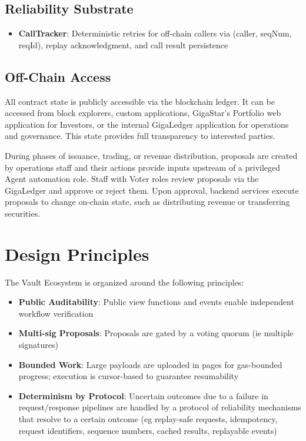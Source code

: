 \documentclass[10pt]{article}
\begin{document}
\subsection{Reliability Substrate}
\begin{itemize}
    \item \textbf{CallTracker}: Deterministic retries for off-chain callers via (caller, seqNum, reqId), replay acknowledgment, and call result persistence
\end{itemize}

\subsection{Off-Chain Access}
All contract state is publicly accessible via the blockchain ledger. It can be accessed from block explorers,
custom applications, GigaStar's Portfolio web application for Investors, or the internal GigaLedger
application for operations and governance. This state provides full transparency to interested parties.

During phases of issuance, trading, or revenue distribution, proposals are created by operations staff and
their actions provide inputs upstream of a privileged Agent automation role. Staff with Voter roles review
proposals via the GigaLedger and approve or reject them. Upon approval, backend services execute
proposals to change on-chain state, such as distributing revenue or transferring securities.

\section{Design Principles}
The Vault Ecosystem is organized around the following principles:

\begin{itemize}
    \item \textbf{Public Auditability}: Public view functions and events enable independent workflow verification

    \item \textbf{Multi-sig Proposals}: Proposals are gated by a voting quorum (ie multiple signatures)

    \item \textbf{Bounded Work}: Large payloads are uploaded in pages for gas-bounded progress; execution is cursor-based to guarantee resumability

    \item \textbf{Determinism by Protocol}: Uncertain outcomes due to a failure in request/response pipelines are handled by a protocol of reliability mechanisms that resolve to a certain outcome (eg replay-safe requests, idempotency, request identifiers, sequence numbers, cached results, replayable events)
\end{itemize}
\end{document}
